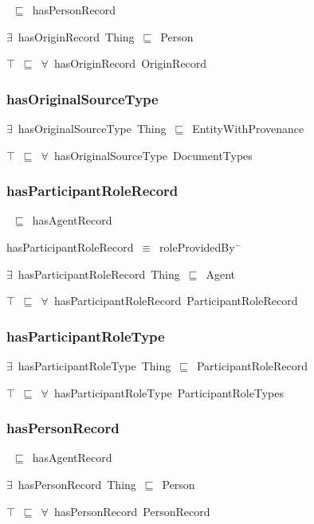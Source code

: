 \documentclass{article}
\begin{document}
~\ensuremath{\sqsubseteq}~hasPersonRecord

\ensuremath{\exists}~hasOriginRecord~Thing~\ensuremath{\sqsubseteq}~Person

\ensuremath{\top}~\ensuremath{\sqsubseteq}~\ensuremath{\forall}~hasOriginRecord~OriginRecord

\subsubsection*{hasOriginalSourceType}

\ensuremath{\exists}~hasOriginalSourceType~Thing~\ensuremath{\sqsubseteq}~EntityWithProvenance

\ensuremath{\top}~\ensuremath{\sqsubseteq}~\ensuremath{\forall}~hasOriginalSourceType~DocumentTypes

\subsubsection*{hasParticipantRoleRecord}

~\ensuremath{\sqsubseteq}~hasAgentRecord

hasParticipantRoleRecord~\ensuremath{\equiv}~roleProvidedBy\ensuremath{^-}

\ensuremath{\exists}~hasParticipantRoleRecord~Thing~\ensuremath{\sqsubseteq}~Agent

\ensuremath{\top}~\ensuremath{\sqsubseteq}~\ensuremath{\forall}~hasParticipantRoleRecord~ParticipantRoleRecord

\subsubsection*{hasParticipantRoleType}

\ensuremath{\exists}~hasParticipantRoleType~Thing~\ensuremath{\sqsubseteq}~ParticipantRoleRecord

\ensuremath{\top}~\ensuremath{\sqsubseteq}~\ensuremath{\forall}~hasParticipantRoleType~ParticipantRoleTypes

\subsubsection*{hasPersonRecord}

~\ensuremath{\sqsubseteq}~hasAgentRecord

\ensuremath{\exists}~hasPersonRecord~Thing~\ensuremath{\sqsubseteq}~Person

\ensuremath{\top}~\ensuremath{\sqsubseteq}~\ensuremath{\forall}~hasPersonRecord~PersonRecord
\end{document}
